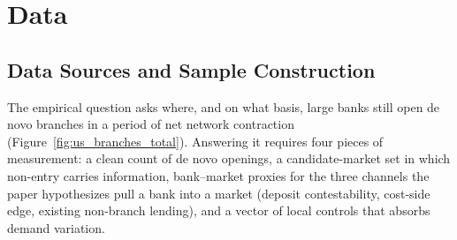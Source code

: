 
\section{Data}
\label{sec:data}

\subsection{Data Sources and Sample Construction}
\label{sec:data:sources}

The empirical question asks where, and on what basis, large banks still open de novo branches in a period of net network contraction (Figure~\ref{fig:us_branches_total}). Answering it requires four pieces of measurement: a clean count of de novo openings, a candidate-market set in which non-entry carries information, bank--market proxies for the three channels the paper hypothesizes pull a bank into a market (deposit contestability, cost-side edge, existing non-branch lending), and a vector of local controls that absorbs demand variation.


